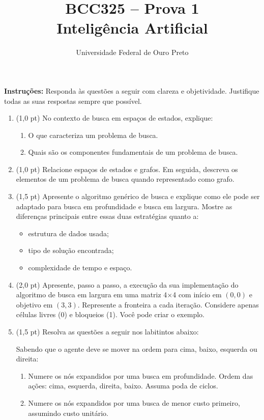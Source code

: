 \documentclass[12pt]{article}
\title{BCC325 – Prova 1 \\ Inteligência Artificial}
\author{Universidade Federal de Ouro Preto}
\date{}
\begin{document}
\maketitle

\vspace{0.5cm}

\textbf{Instruções:} Responda às questões a seguir com clareza e objetividade. Justifique todas as suas respostas sempre que possível. 

\begin{enumerate}

\item (1,0 pt) No contexto de busca em espaços de estados, explique:
\begin{enumerate}
    \item O que caracteriza um problema de busca.
    \item Quais são os componentes fundamentais de um problema de busca.
\end{enumerate}

\item (1,0 pt) Relacione espaços de estados e grafos. Em seguida, descreva os elementos de um problema de busca quando representado como grafo.

\item (1,5 pt) Apresente o algoritmo genérico de busca e explique como ele pode ser adaptado para busca em profundidade e busca em largura. Mostre as diferenças principais entre essas duas estratégias quanto a:
\begin{itemize}
    \item estrutura de dados usada;
    \item tipo de solução encontrada;
    \item complexidade de tempo e espaço.
\end{itemize}


\item (2,0 pt) Apresente, passo a passo, a execução da sua implementação do algoritmo de busca em largura em uma matriz 4×4 com início em $(0,0)$ e objetivo em $(3,3)$. Represente a fronteira a cada iteração. Considere apenas células livres (0) e bloqueios (1). Você pode criar o exemplo.

\item (1,5 pt) Resolva as questões a seguir nos labitintos abaixo:

Sabendo que o agente deve se mover na ordem para cima, baixo, esquerda ou direita:

\begin{enumerate}
    \item Numere os nós expandidos por uma busca em profundidade. Ordem das ações: cima, esquerda, direita, baixo. Assuma poda de ciclos.
    \item Numere os nós expandidos por uma busca de menor custo primeiro, assumindo custo unitário.
\end{enumerate}


\end{enumerate}
\end{document}
